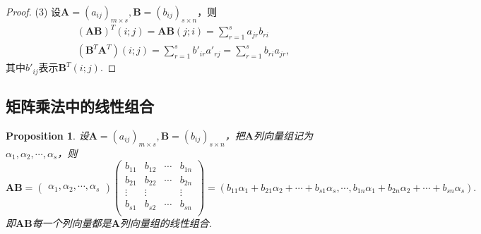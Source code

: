 \documentclass{article}
\newtheorem{proposition}[theorem]{Proposition}
\newcommand{\mbf}[1]{\bm{#1}}
\begin{document}
\begin{proof}
(3) 设$\mbf{A}=(a_{ij})_{m\times s},\mbf{B}=(b_{ij})_{s\times n}$，则
$$
\begin{array}{ll}
(\mbf{A}\mbf{B})^T(i;j) = \mbf{A}\mbf{B}(j;i) = \sum\limits_{r = 1}^s a_{jr}b_{ri} \\
(\mbf{B}^T\mbf{A}^T)(i;j) = \sum\limits_{r = 1}^s b'_{ir}a'_{rj} = \sum\limits_{r = 1}^s b_{ri}a_{jr},
\end{array}
$$
其中$b'_{ij}$表示$\mbf{B}^T(i;j)$.
\end{proof}

\subsection{矩阵乘法中的线性组合}

\begin{proposition}
\rm 设$\mbf{A}=(a_{ij})_{m \times s},\mbf{B}=(b_{ij})_{s \times n}$，把$\mbf{A}$列向量组记为$\alpha_1,\alpha_2,\cdots,\alpha_s$，则
$$
\mbf{A}\mbf{B} = \begin{pmatrix}
\alpha_1,\alpha_2,\cdots,\alpha_s
\end{pmatrix}\begin{pmatrix}
b_{11} & b_{12} & \cdots & b_{1n} \\
b_{21} & b_{22} & \cdots & b_{2n} \\
\vdots & \vdots & 		 & \vdots \\
b_{s1} & b_{s2} & \cdots & b_{sn} \\
\end{pmatrix} =
(b_{11}\alpha_1 + b_{21}\alpha_2 + \cdots + b_{s1}\alpha_s,\cdots, b_{1n}\alpha_1 + b_{2n}\alpha_2 + \cdots + b_{sn}\alpha_s).
$$
即$\mbf{A}\mbf{B}$每一个列向量都是$\mbf{A}$列向量组的线性组合.
\end{proposition}
\end{document}

